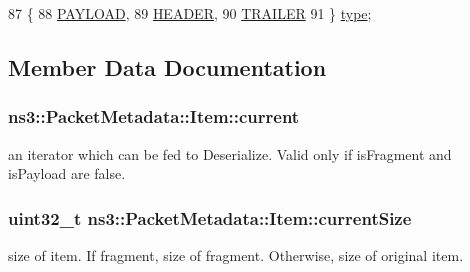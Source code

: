 \begin{DoxyCode}
87          \{
88       \hyperlink{structns3_1_1PacketMetadata_1_1Item_ab0a06781a8793079afeab58a9a9b3174ac2bc28ee0adb79d428d3f5a11be52f80}{PAYLOAD},
89       \hyperlink{structns3_1_1PacketMetadata_1_1Item_ab0a06781a8793079afeab58a9a9b3174a35a76b7dc57ca42587ecfb5f81f1bcb2}{HEADER},
90       \hyperlink{structns3_1_1PacketMetadata_1_1Item_ab0a06781a8793079afeab58a9a9b3174ab32282a2f84adad5e57549c03179ff45}{TRAILER}
91     \} \hyperlink{structns3_1_1PacketMetadata_1_1Item_a76d4fe6402891fd8d840442d51b0f6a0}{type}; 
\end{DoxyCode}


\subsection{Member Data Documentation}
\subsubsection[{\texorpdfstring{current}{current}}]{ ns3\+::\+Packet\+Metadata\+::\+Item\+::current}\hypertarget{structns3_1_1PacketMetadata_1_1Item_aa8c1eed1363b2965204125b91659f639}{}\label{structns3_1_1PacketMetadata_1_1Item_aa8c1eed1363b2965204125b91659f639}
an iterator which can be fed to Deserialize. Valid only if is\+Fragment and is\+Payload are false. 
\subsubsection[{\texorpdfstring{current\+Size}{currentSize}}]{\setlength{\rightskip}{0pt plus 5cm}uint32\+\_\+t ns3\+::\+Packet\+Metadata\+::\+Item\+::current\+Size}\hypertarget{structns3_1_1PacketMetadata_1_1Item_afe99c84baf1db382630fab75a464fc63}{}\label{structns3_1_1PacketMetadata_1_1Item_afe99c84baf1db382630fab75a464fc63}
size of item. If fragment, size of fragment. Otherwise, size of original item. 
